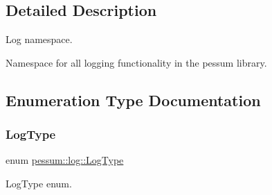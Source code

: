 \subsection{Detailed Description}
Log namespace. 

Namespace for all logging functionality in the pessum library. 

\subsection{Enumeration Type Documentation}
\mbox{\label{namespacepessum_1_1log_a67fb11f9f43693f8926c9cfaa70ecd55}} 
\subsubsection{\texorpdfstring{Log\+Type}{LogType}}
{\footnotesize\ttfamily enum \hyperlink{namespacepessum_1_1log_a67fb11f9f43693f8926c9cfaa70ecd55}{pessum\+::log\+::\+Log\+Type}}



Log\+Type enum. 

